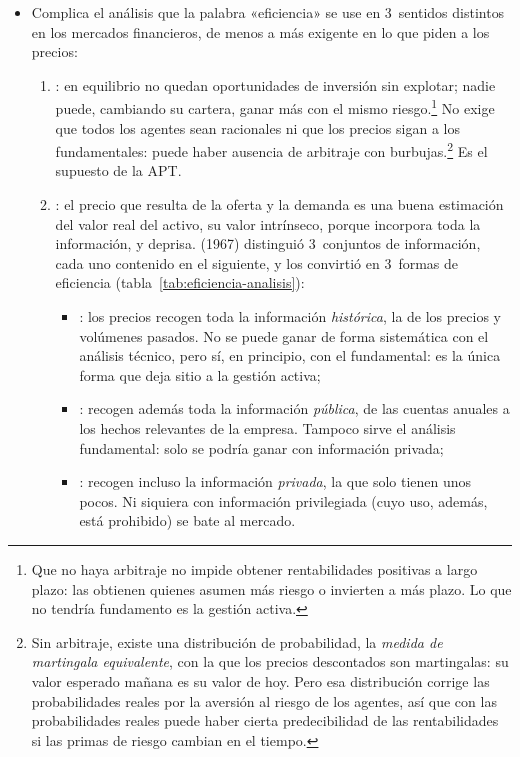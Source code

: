 \documentclass[11pt]{article}
\begin{document}
\begin{itemize}
\item Complica el análisis que la palabra «eficiencia» se use en 3~sentidos distintos en los mercados financieros\nocite{Duffie2001Dynamic}, de menos a más exigente en lo que piden a los precios:
  \begin{enumerate}
  \item {}: en equilibrio no quedan oportunidades de inversión sin explotar; nadie puede, cambiando su cartera, ganar más con el mismo riesgo.\footnote{Que no haya arbitraje no impide obtener rentabilidades positivas a largo plazo: las obtienen quienes asumen más riesgo o invierten a más plazo. Lo que no tendría fundamento es la gestión activa.} No exige que todos los agentes sean racionales ni que los precios sigan a los fundamentales: puede haber ausencia de arbitraje con burbujas.\footnote{Sin arbitraje, existe una distribución de probabilidad, la \emph{medida de martingala equivalente}, con la que los precios descontados son martingalas: su valor esperado mañana es su valor de hoy\nocite{HarrisonKreps1979}. Pero esa distribución corrige las probabilidades reales por la aversión al riesgo de los agentes, así que con las probabilidades reales puede haber cierta predecibilidad de las rentabilidades si las primas de riesgo cambian en el tiempo.} Es el supuesto de la APT.
  \item {}: el precio que resulta de la oferta y la demanda es una buena estimación del valor real del activo, su valor intrínseco, porque incorpora toda la información, y deprisa.  (1967) distinguió 3~conjuntos de información, cada uno contenido en el siguiente, y \textcite{Fama1970Efficient} los convirtió en 3~formas de eficiencia (tabla~\ref{tab:eficiencia-analisis}):
    \begin{itemize}
    \item {}: los precios recogen toda la información \emph{histórica}, la de los precios y volúmenes pasados. No se puede ganar de forma sistemática con el análisis técnico, pero sí, en principio, con el fundamental: es la única forma que deja sitio a la gestión activa;
    \item {}: recogen además toda la información \emph{pública}, de las cuentas anuales a los hechos relevantes de la empresa. Tampoco sirve el análisis fundamental: solo se podría ganar con información privada;
    \item {}: recogen incluso la información \emph{privada}, la que solo tienen unos pocos. Ni siquiera con información privilegiada (cuyo uso, además, está prohibido) se bate al mercado.

\end{itemize}
\end{enumerate}
\end{itemize}
\end{document}
